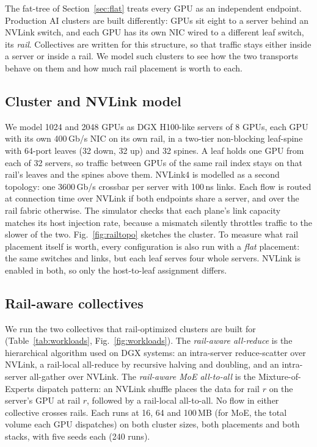 \documentclass[conference]{IEEEtran}
\begin{document}
The fat-tree of Section~\ref{sec:flat} treats every GPU as an independent
endpoint. Production AI clusters are built differently: GPUs sit eight to a
server behind an NVLink switch, and each GPU has its own NIC wired to a
different leaf switch, its \emph{rail}. Collectives are written for this
structure, so that traffic stays either inside a server or inside a rail. We
model such clusters to see how the two transports behave on them and how much
rail placement is worth to each.

\subsection{Cluster and NVLink model}

We model 1024 and 2048 GPUs as DGX H100-like servers of 8 GPUs, each GPU with
its own 400\,Gb/s NIC on its own rail, in a two-tier non-blocking leaf-spine
with 64-port leaves (32 down, 32 up) and 32 spines. A leaf holds one GPU from
each of 32 servers, so traffic between GPUs of the same rail index stays on
that rail's leaves and the spines above them. NVLink4 is modelled as a second
topology: one 3600\,Gb/s crossbar per server with 100\,ns links. Each flow is
routed at connection time over NVLink if both endpoints share a server, and
over the rail fabric otherwise. The simulator checks that each plane's link
capacity matches its host injection rate, because a mismatch silently
throttles traffic to the slower of the two. Fig.~\ref{fig:railtopo} sketches
the cluster. To measure what rail placement itself is worth, every
configuration is also run with a \emph{flat} placement: the same switches and
links, but each leaf serves four whole servers. NVLink is enabled in both, so
only the host-to-leaf assignment differs.


\subsection{Rail-aware collectives}

We run the two collectives that rail-optimized clusters are built for
(Table~\ref{tab:workloads}, Fig.~\ref{fig:workloads}). The \emph{rail-aware
all-reduce} is the hierarchical algorithm used on DGX systems: an intra-server
reduce-scatter over NVLink, a rail-local all-reduce by recursive halving and
doubling, and an intra-server all-gather over NVLink. The \emph{rail-aware MoE
all-to-all} is the Mixture-of-Experts dispatch pattern: an NVLink shuffle
places the data for rail $r$ on the server's GPU at rail $r$, followed by a
rail-local all-to-all. No flow in either collective crosses rails. Each runs
at 16, 64 and 100\,MB (for MoE, the total volume each GPU dispatches) on both
cluster sizes, both placements and both stacks, with five seeds each (240 runs).
\end{document}
